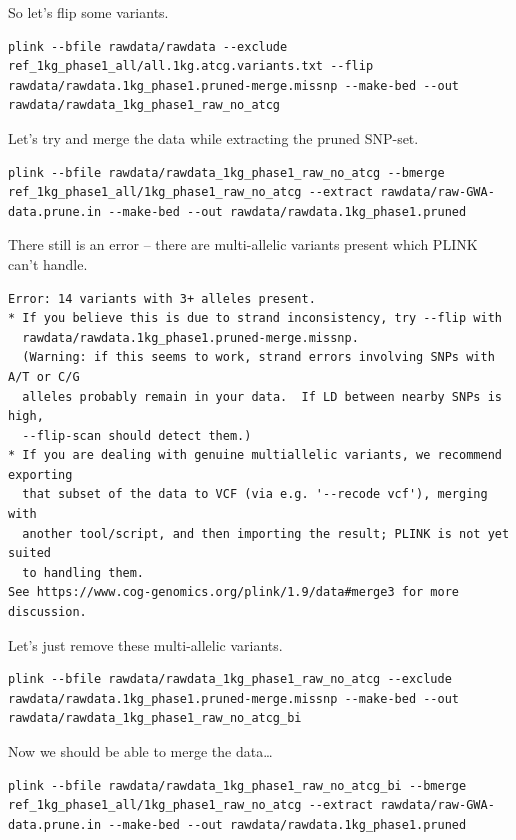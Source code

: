 \documentclass[
]{book}
\begin{document}
So let's flip some variants.

\begin{verbatim}
plink --bfile rawdata/rawdata --exclude ref_1kg_phase1_all/all.1kg.atcg.variants.txt --flip rawdata/rawdata.1kg_phase1.pruned-merge.missnp --make-bed --out rawdata/rawdata_1kg_phase1_raw_no_atcg
\end{verbatim}

Let's try and merge the data while extracting the pruned SNP-set.

\begin{verbatim}
plink --bfile rawdata/rawdata_1kg_phase1_raw_no_atcg --bmerge ref_1kg_phase1_all/1kg_phase1_raw_no_atcg --extract rawdata/raw-GWA-data.prune.in --make-bed --out rawdata/rawdata.1kg_phase1.pruned
\end{verbatim}

There still is an error -- there are multi-allelic variants present which PLINK can't handle.

\begin{verbatim}
Error: 14 variants with 3+ alleles present.
* If you believe this is due to strand inconsistency, try --flip with
  rawdata/rawdata.1kg_phase1.pruned-merge.missnp.
  (Warning: if this seems to work, strand errors involving SNPs with A/T or C/G
  alleles probably remain in your data.  If LD between nearby SNPs is high,
  --flip-scan should detect them.)
* If you are dealing with genuine multiallelic variants, we recommend exporting
  that subset of the data to VCF (via e.g. '--recode vcf'), merging with
  another tool/script, and then importing the result; PLINK is not yet suited
  to handling them.
See https://www.cog-genomics.org/plink/1.9/data#merge3 for more discussion.
\end{verbatim}

Let's just remove these multi-allelic variants.

\begin{verbatim}
plink --bfile rawdata/rawdata_1kg_phase1_raw_no_atcg --exclude rawdata/rawdata.1kg_phase1.pruned-merge.missnp --make-bed --out rawdata/rawdata_1kg_phase1_raw_no_atcg_bi
\end{verbatim}

Now we should be able to merge the data\ldots{}

\begin{verbatim}
plink --bfile rawdata/rawdata_1kg_phase1_raw_no_atcg_bi --bmerge ref_1kg_phase1_all/1kg_phase1_raw_no_atcg --extract rawdata/raw-GWA-data.prune.in --make-bed --out rawdata/rawdata.1kg_phase1.pruned
\end{verbatim}
\end{document}
